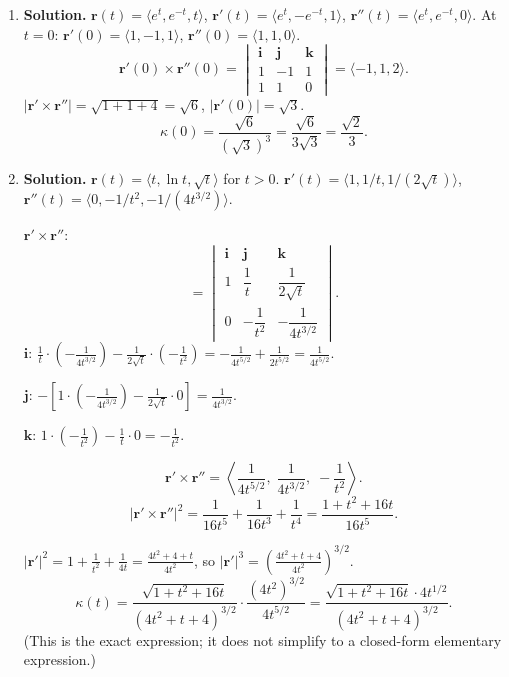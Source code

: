 \begin{enumerate}
\item \textbf{Solution.}
$\mathbf{r}(t)=\langle e^t, e^{-t}, t\rangle$, $\mathbf{r}'(t)=\langle e^t, -e^{-t}, 1\rangle$, $\mathbf{r}''(t)=\langle e^t, e^{-t}, 0\rangle$.
At $t=0$: $\mathbf{r}'(0)=\langle 1,-1,1\rangle$, $\mathbf{r}''(0)=\langle 1,1,0\rangle$.
\[
\mathbf{r}'(0)\times\mathbf{r}''(0)=\begin{vmatrix}\mathbf{i}&\mathbf{j}&\mathbf{k}\\1&-1&1\\1&1&0\end{vmatrix}=\langle -1,1,2\rangle.
\]
$|\mathbf{r}'\times\mathbf{r}''|=\sqrt{1+1+4}=\sqrt{6}$, $|\mathbf{r}'(0)|=\sqrt{3}$.
\[
\boxed{\kappa(0)=\frac{\sqrt{6}}{(\sqrt{3})^3}=\frac{\sqrt{6}}{3\sqrt{3}}=\frac{\sqrt{2}}{3}.}
\]

\item \textbf{Solution.}
$\mathbf{r}(t)=\langle t, \ln t, \sqrt{t}\rangle$ for $t>0$.
$\mathbf{r}'(t)=\langle 1, 1/t, 1/(2\sqrt{t})\rangle$, $\mathbf{r}''(t)=\langle 0, -1/t^2, -1/(4t^{3/2})\rangle$.

$\mathbf{r}'\times\mathbf{r}''$:
\[
= \begin{vmatrix}\mathbf{i}&\mathbf{j}&\mathbf{k}\\[3pt]1&\dfrac{1}{t}&\dfrac{1}{2\sqrt{t}}\\[6pt]0&-\dfrac{1}{t^2}&-\dfrac{1}{4t^{3/2}}\end{vmatrix}.
\]
$\mathbf{i}$: $\frac{1}{t}\cdot\left(-\frac{1}{4t^{3/2}}\right)-\frac{1}{2\sqrt{t}}\cdot\left(-\frac{1}{t^2}\right) = -\frac{1}{4t^{5/2}}+\frac{1}{2t^{5/2}}=\frac{1}{4t^{5/2}}$.

$\mathbf{j}$: $-\left[1\cdot\left(-\frac{1}{4t^{3/2}}\right)-\frac{1}{2\sqrt{t}}\cdot 0\right]=\frac{1}{4t^{3/2}}$.

$\mathbf{k}$: $1\cdot\left(-\frac{1}{t^2}\right)-\frac{1}{t}\cdot 0 = -\frac{1}{t^2}$.

\[
\mathbf{r}'\times\mathbf{r}'' = \left\langle \frac{1}{4t^{5/2}},\; \frac{1}{4t^{3/2}},\; -\frac{1}{t^2}\right\rangle.
\]
\[
|\mathbf{r}'\times\mathbf{r}''|^2 = \frac{1}{16t^5}+\frac{1}{16t^3}+\frac{1}{t^4} = \frac{1+t^2+16t}{16t^5}.
\]

$|\mathbf{r}'|^2 = 1+\frac{1}{t^2}+\frac{1}{4t} = \frac{4t^2+4+t}{4t^2}$, so $|\mathbf{r}'|^3=\left(\frac{4t^2+t+4}{4t^2}\right)^{3/2}$.
\[
\boxed{\kappa(t)=\frac{\sqrt{1+t^2+16t}}{(4t^2+t+4)^{3/2}}\cdot\frac{(4t^2)^{3/2}}{4t^{5/2}} = \frac{\sqrt{1+t^2+16t}\cdot 4t^{1/2}}{(4t^2+t+4)^{3/2}}.}
\]
(This is the exact expression; it does not simplify to a closed-form elementary expression.)


\end{enumerate}
